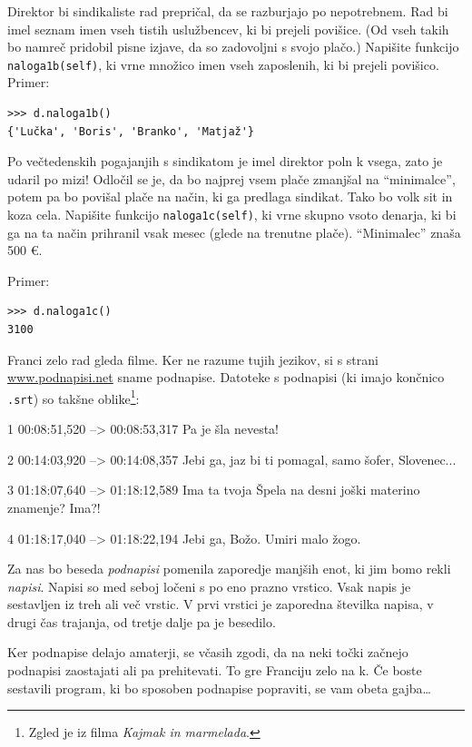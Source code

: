 \documentclass[arhiv]{../izpit}
\begin{document}
\podnaloga[10 točk]
Direktor bi sindikaliste rad prepričal, da se razburjajo po nepotrebnem. Rad bi imel seznam imen vseh tistih uslužbencev, ki bi prejeli povišice. (Od vseh takih bo namreč pridobil pisne izjave, da so zadovoljni s svojo plačo.) Napišite funkcijo \texttt{naloga1b(self)}, ki vrne množico imen vseh zaposlenih, ki bi prejeli povišico. Primer:
%
\begin{verbatim}
>>> d.naloga1b()
{'Lučka', 'Boris', 'Branko', 'Matjaž'}
\end{verbatim}

\podnaloga[10 točk]
Po večtedenskih pogajanjih s sindikatom je imel direktor poln k vsega, zato je udaril po mizi! Odločil se je, da bo najprej vsem plače zmanjšal na ``minimalce'', potem pa bo povišal plače na način, ki ga predlaga sindikat. Tako bo volk sit in koza cela. Napišite funkcijo \texttt{naloga1c(self)}, ki vrne skupno vsoto denarja, ki bi ga na ta način prihranil vsak mesec (glede na trenutne plače). ``Minimalec'' znaša 500 \euro.

Primer:
%
\begin{verbatim}
>>> d.naloga1c()
3100
\end{verbatim}


Franci zelo rad gleda filme. Ker ne razume tujih jezikov, si s strani \url{www.podnapisi.net} sname
podnapise. Datoteke s podnapisi (ki imajo končnico \verb+.srt+) so takšne oblike\footnote{Zgled je iz filma \emph{Kajmak in marmelada}.}:
\begin{verbatim*}
1
00:08:51,520 --> 00:08:53,317
Pa je šla nevesta!

2
00:14:03,920 --> 00:14:08,357
Jebi ga, jaz bi ti pomagal,
samo šofer, Slovenec...

3
01:18:07,640 --> 01:18:12,589
Ima ta tvoja Špela na desni
joški materino znamenje? Ima?!

4
01:18:17,040 --> 01:18:22,194
Jebi ga, Božo.
Umiri malo žogo.
\end{verbatim*}
Za nas bo beseda \emph{podnapisi} pomenila zaporedje manjših enot, ki jim bomo rekli \emph{napisi}. Napisi so med seboj ločeni s po eno prazno vrstico. Vsak napis je sestavljen iz treh ali več vrstic. V prvi vrstici je zaporedna številka napisa, v drugi čas trajanja, od tretje dalje pa je besedilo.

Ker podnapise delajo amaterji, se včasih zgodi, da na neki točki začnejo podnapisi zaostajati ali pa prehitevati.
To gre Franciju zelo na k. Če boste sestavili program, ki bo sposoben podnapise
popraviti, se vam obeta gajba\ldots
\end{document}
